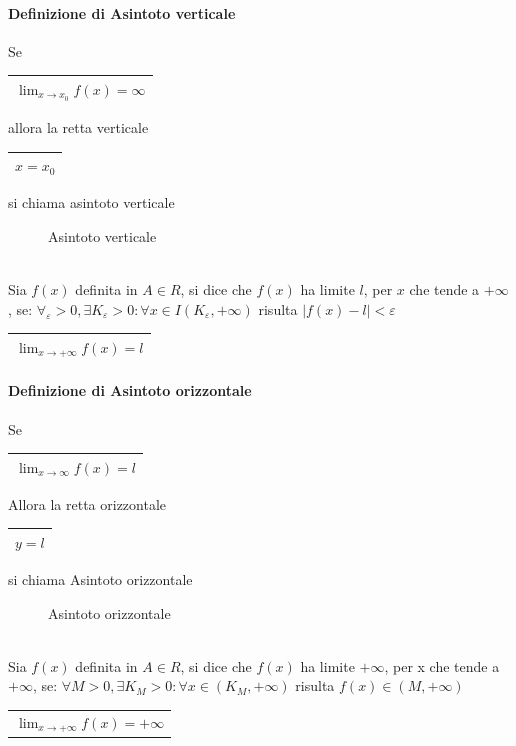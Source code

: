 \paragraph{Definizione di Asintoto verticale}
Se 	\begin{tabular}{|l|}
		\hline
		$\lim_{x\to x_0}f(x)=\infty$\\\hline
\end{tabular} allora la retta verticale \begin{tabular}{|l|}
	\hline
	$x=x_0$\\\hline
\end{tabular} si chiama asintoto verticale
\begin{figure}[!ht]
	\centering
	\caption{Asintoto verticale}
\end{figure}\\
Sia $f(x)$ definita in $A\in R$, si dice che $f(x)$ ha limite $l$, per $x$ che
tende a $+\infty$, se: $\forall_\varepsilon>0, \exists K_\varepsilon >0:\forall
x \in I (K_\varepsilon, +\infty)$ risulta $|f(x)-l|<\varepsilon$
\begin{tabular}{|l|}
	\hline
	$\lim_{x\to+\infty}f(x)=l$\\\hline
\end{tabular}
\newpage
\paragraph{Definizione di Asintoto orizzontale} Se \begin{tabular}{|l|}
	\hline
	$\lim_{x\to \infty}f(x)=l$\\\hline
\end{tabular} Allora la retta orizzontale \begin{tabular}{|l|}
	\hline
	$y=l$\\\hline
\end{tabular} si chiama Asintoto orizzontale
\begin{figure}[!ht]
	\centering
	\caption{Asintoto orizzontale}
\end{figure}\\
Sia $f(x)$ definita in $A \in R$, si dice che $f(x)$ ha limite $+\infty$, per x
che tende a $+\infty$, se: $\forall M>0, \exists K_M >0: \forall x \in (K_M,
+\infty)$ risulta $f(x)\in (M,+\infty)$ \begin{tabular}{|l|}
	$\lim_{x\to +\infty}f(x) = +\infty$
\end{tabular}
